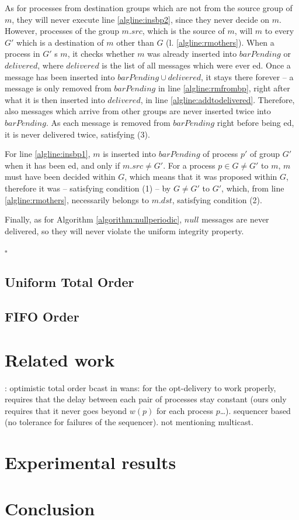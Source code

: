 \documentclass[times, 10pt]{article}
\begin{document}
As for processes from destination groups which are not from the source group of $m$, they will never execute line \ref{algline:insbp2}, since they never decide on $m$. However, processes of the group $m.src$, which is the source of $m$, will \rmc{} $m$ to every $G'$ which is a destination of $m$ other than $G$ (l. \ref{algline:rmothers}). When a process in $G'$ \rmd{}s $m$, it checks whether $m$ was already inserted into $barPending$ or $delivered$, where $delivered$ is the list of all messages which were ever \cmd{}ed. Once a message has been inserted into \mbox{$barPending \cup delivered$}, it stays there forever -- a message is only removed from $barPending$ in line \ref{algline:rmfrombp}, right after what it is then inserted into $delivered$, in line \ref{algline:addtodelivered}. Therefore, also messages which arrive from other groups are never inserted twice into $barPending$. As each message is removed from $barPending$ right before being \cmd{}ed, it is never delivered twice, satisfying (3).

For line \ref{algline:insbp1}, $m$ is inserted into $barPending$ of process $p'$ of group $G'$ when it has been \rmd{}ed, and only if $m.src \neq G'$. For a process $p \in G \neq G'$ to \rmc{} $m$, $m$ must have been decided within $G$, which means that it was proposed within $G$, therefore it was \cms{} -- satisfying condition (1) -- by $G \neq G'$ to $G'$, which, from line \ref{algline:rmothers}, necessarily belongs to $m.dst$, satisfying condition (2).

Finally, as for Algorithm \ref{algorithm:nullperiodic}, $null$ messages are never delivered, so they will never violate the uniform integrity property.

\begin{flushright}
$\square$
\end{flushright}

\subsection{Uniform Total Order}

\subsection{FIFO Order}

\section{Related work}

\cite{sousa2002oto}: optimistic total order bcast in wans: for the opt-delivery to work properly, requires that the delay between each pair of processes stay constant (ours only requires that it never goes beyond $w(p)$ for each process $p$\ldots). sequencer based (no tolerance for failures of the sequencer). not mentioning multicast.

\section{Experimental results}

\section{Conclusion}

%
%


\end{document}
